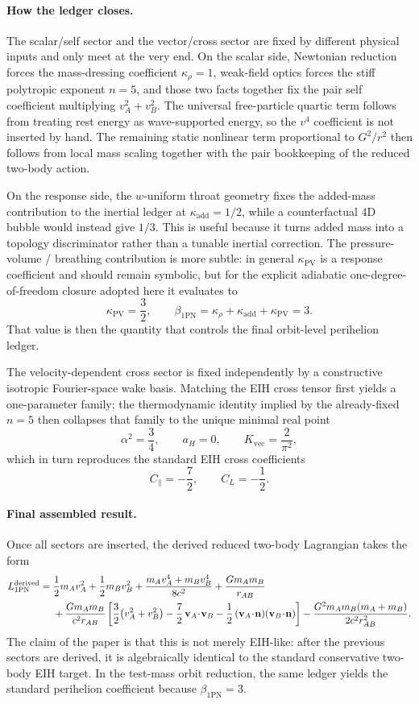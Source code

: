 \documentclass[11pt]{article}
\newcommand{\vct}{\mathbf v}
\newcommand{\nvec}{\mathbf n}
\newcommand{\kadd}{\kappa_{\mathrm{add}}}
\newcommand{\kPV}{\kappa_{\mathrm{PV}}}
\newcommand{\krho}{\kappa_{\rho}}
\newcommand{\betaPN}{\beta_{\mathrm{1PN}}}
\newcommand{\Kvec}{K_{\mathrm{vec}}}
\newcommand{\alphaSq}{\alpha^2}
\newcommand{\Cpara}{C_{\parallel}}
\newcommand{\CLong}{C_{L}}
\begin{document}
\paragraph{How the ledger closes.}
The scalar/self sector and the vector/cross sector are fixed by different physical inputs and only meet at the very end. On the scalar side, Newtonian reduction forces the mass-dressing coefficient \(\krho=1\), weak-field optics forces the stiff polytropic exponent \(n=5\), and those two facts together fix the pair self coefficient multiplying \(v_A^2+v_B^2\). The universal free-particle quartic term follows from treating rest energy as wave-supported energy, so the \(v^4\) coefficient is not inserted by hand. The remaining static nonlinear term proportional to \(G^2/r^2\) then follows from local mass scaling together with the pair bookkeeping of the reduced two-body action.

On the response side, the \(w\)-uniform throat geometry fixes the added-mass contribution to the inertial ledger at \(\kadd=1/2\), while a counterfactual \(4\)D bubble would instead give \(1/3\). This is useful because it turns added mass into a topology discriminator rather than a tunable inertial correction. The pressure-volume / breathing contribution is more subtle: in general \(\kPV\) is a response coefficient and should remain symbolic, but for the explicit adiabatic one-degree-of-freedom closure adopted here it evaluates to
\[
\kPV=\frac32,
\qquad
\betaPN=\krho+\kadd+\kPV=3.
\]
That value is then the quantity that controls the final orbit-level perihelion ledger.

The velocity-dependent cross sector is fixed independently by a constructive isotropic Fourier-space wake basis. Matching the EIH cross tensor first yields a one-parameter family; the thermodynamic identity implied by the already-fixed \(n=5\) then collapses that family to the unique minimal real point
\[
\alphaSq=\frac34,
\qquad
a_H=0,
\qquad
\Kvec=\frac{2}{\pi^2},
\]
which in turn reproduces the standard EIH cross coefficients
\[
\Cpara=-\frac72,
\qquad
\CLong=-\frac12.
\]

\paragraph{Final assembled result.}
Once all sectors are inserted, the derived reduced two-body Lagrangian takes the form
\begin{align}
L_{\rm 1PN}^{\rm derived}
={}&
\frac12 m_A v_A^2 + \frac12 m_B v_B^2
+ \frac{m_A v_A^4 + m_B v_B^4}{8c^2}
+ \frac{Gm_A m_B}{r_{AB}}
\nonumber\\
&
+ \frac{Gm_A m_B}{c^2 r_{AB}}
\left[
\frac32\bigl(v_A^2+v_B^2\bigr)
-\frac72\,\vct_A\!\cdot\!\vct_B
-\frac12\,(\vct_A\!\cdot\!\nvec)(\vct_B\!\cdot\!\nvec)
\right]
- \frac{G^2m_A m_B(m_A+m_B)}{2c^2 r_{AB}^2}.
\label{eq:exec-eih-summary}
\end{align}
The claim of the paper is that this is not merely EIH-like: after the previous sectors are derived, it is algebraically identical to the standard conservative two-body EIH target. In the test-mass orbit reduction, the same ledger yields the standard perihelion coefficient because \(\betaPN=3\).
\end{document}
